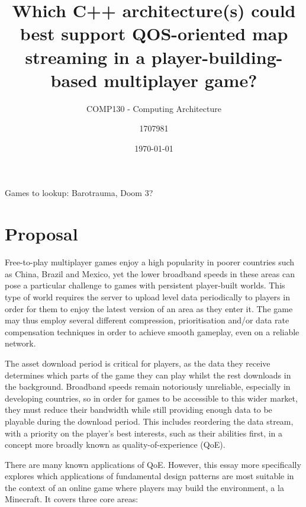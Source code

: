 \documentclass{scrartcl}
\title{Which C++ architecture(s) could best support QOS-oriented map streaming in a player-building-based multiplayer game?}
\subtitle{COMP130 - Computing Architecture}
\date{\today}
\author{1707981}
\begin{document}
	\maketitle

Games to lookup: Barotrauma, Doom 3?

\section{Proposal}
Free-to-play multiplayer games enjoy a high popularity in poorer countries such as China, Brazil and Mexico, yet the lower broadband speeds in these areas can pose a particular challenge to games with persistent player-built worlds. This type of world requires the server to upload level data periodically to players in order for them to enjoy the latest version of an area as they enter it. The game may thus employ several different compression, prioritisation and/or data rate compensation techniques in order to achieve smooth gameplay, even on a reliable network.

The asset download period is critical for players, as the data they receive determines which parts of the game they can play whilst the rest downloads in the background. Broadband speeds remain notoriously unreliable, especially in developing countries, so in order for games to be accessible to this wider market, they must reduce their bandwidth while still providing enough data to be playable during the download period. This includes reordering the data stream, with a priority on the player's best interests, such as their abilities first, in a concept more broadly known as quality-of-experience (QoE).

There are many known applications of QoE. However, this essay more specifically explores which applications of fundamental design patterns are most suitable in the context of an online game where players may build the environment, a la Minecraft. It covers three core areas:
\end{document}
